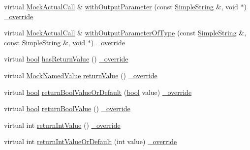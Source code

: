 \begin{DoxyCompactItemize}
\item 
virtual \hyperlink{class_mock_actual_call}{Mock\+Actual\+Call} \& \hyperlink{class_mock_ignored_actual_call_a2ef074953e47056720a405e8cdf6ccd3}{with\+Output\+Parameter} (const \hyperlink{class_simple_string}{Simple\+String} \&, void $\ast$) \hyperlink{_cpp_u_test_config_8h_a049bea15dd750e15869863c94c1efc3b}{\+\_\+override}
\item 
virtual \hyperlink{class_mock_actual_call}{Mock\+Actual\+Call} \& \hyperlink{class_mock_ignored_actual_call_ab67b537a135dd914425d5ad4a92cabbe}{with\+Output\+Parameter\+Of\+Type} (const \hyperlink{class_simple_string}{Simple\+String} \&, const \hyperlink{class_simple_string}{Simple\+String} \&, void $\ast$) \hyperlink{_cpp_u_test_config_8h_a049bea15dd750e15869863c94c1efc3b}{\+\_\+override}
\item 
virtual \hyperlink{avb__gptp_8h_af6a258d8f3ee5206d682d799316314b1}{bool} \hyperlink{class_mock_ignored_actual_call_a7451796798dd10197c297377bf7c0016}{has\+Return\+Value} () \hyperlink{_cpp_u_test_config_8h_a049bea15dd750e15869863c94c1efc3b}{\+\_\+override}
\item 
virtual \hyperlink{class_mock_named_value}{Mock\+Named\+Value} \hyperlink{class_mock_ignored_actual_call_a370e7e7178ce5c5f964d74d112d3447f}{return\+Value} () \hyperlink{_cpp_u_test_config_8h_a049bea15dd750e15869863c94c1efc3b}{\+\_\+override}
\item 
virtual \hyperlink{avb__gptp_8h_af6a258d8f3ee5206d682d799316314b1}{bool} \hyperlink{class_mock_ignored_actual_call_aee0b1150e19e0e642a3de62ea6c1b71d}{return\+Bool\+Value\+Or\+Default} (\hyperlink{avb__gptp_8h_af6a258d8f3ee5206d682d799316314b1}{bool} value) \hyperlink{_cpp_u_test_config_8h_a049bea15dd750e15869863c94c1efc3b}{\+\_\+override}
\item 
virtual \hyperlink{avb__gptp_8h_af6a258d8f3ee5206d682d799316314b1}{bool} \hyperlink{class_mock_ignored_actual_call_a96bc97eca5415d31a07077e1bd810944}{return\+Bool\+Value} () \hyperlink{_cpp_u_test_config_8h_a049bea15dd750e15869863c94c1efc3b}{\+\_\+override}
\item 
virtual int \hyperlink{class_mock_ignored_actual_call_ae327f73a4bdfc27e0129f2c7efb80ae5}{return\+Int\+Value} () \hyperlink{_cpp_u_test_config_8h_a049bea15dd750e15869863c94c1efc3b}{\+\_\+override}
\item 
virtual int \hyperlink{class_mock_ignored_actual_call_a51293fcd6d7a12a023f9ee365e037f80}{return\+Int\+Value\+Or\+Default} (int value) \hyperlink{_cpp_u_test_config_8h_a049bea15dd750e15869863c94c1efc3b}{\+\_\+override}

\end{DoxyCompactItemize}
